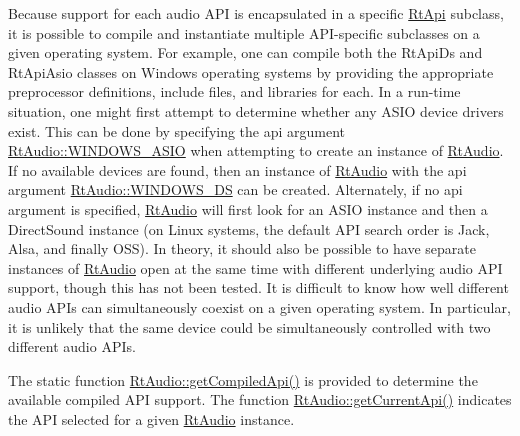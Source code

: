 Because support for each audio A\+PI is encapsulated in a specific \hyperlink{class_rt_api}{Rt\+Api} subclass, it is possible to compile and instantiate multiple A\+P\+I-\/specific subclasses on a given operating system. For example, one can compile both the Rt\+Api\+Ds and Rt\+Api\+Asio classes on Windows operating systems by providing the appropriate preprocessor definitions, include files, and libraries for each. In a run-\/time situation, one might first attempt to determine whether any A\+S\+IO device drivers exist. This can be done by specifying the api argument \hyperlink{class_rt_audio_ac9b6f625da88249d08a8409a9db0d849a219517d1df90f94d07758481155bd469}{Rt\+Audio\+::\+W\+I\+N\+D\+O\+W\+S\+\_\+\+A\+S\+IO} when attempting to create an instance of \hyperlink{class_rt_audio}{Rt\+Audio}. If no available devices are found, then an instance of \hyperlink{class_rt_audio}{Rt\+Audio} with the api argument \hyperlink{class_rt_audio_ac9b6f625da88249d08a8409a9db0d849a28478830f42c2fd61e6c7ad498901931}{Rt\+Audio\+::\+W\+I\+N\+D\+O\+W\+S\+\_\+\+DS} can be created. Alternately, if no api argument is specified, \hyperlink{class_rt_audio}{Rt\+Audio} will first look for an A\+S\+IO instance and then a Direct\+Sound instance (on Linux systems, the default A\+PI search order is Jack, Alsa, and finally O\+SS). In theory, it should also be possible to have separate instances of \hyperlink{class_rt_audio}{Rt\+Audio} open at the same time with different underlying audio A\+PI support, though this has not been tested. It is difficult to know how well different audio A\+P\+Is can simultaneously coexist on a given operating system. In particular, it is unlikely that the same device could be simultaneously controlled with two different audio A\+P\+Is.

The static function \hyperlink{class_rt_audio_a1df0b60d45637f65dab961b658056503}{Rt\+Audio\+::get\+Compiled\+Api()} is provided to determine the available compiled A\+PI support. The function \hyperlink{class_rt_audio_a83687634795792b2c47e4ae1cf8a5246}{Rt\+Audio\+::get\+Current\+Api()} indicates the A\+PI selected for a given \hyperlink{class_rt_audio}{Rt\+Audio} instance. 